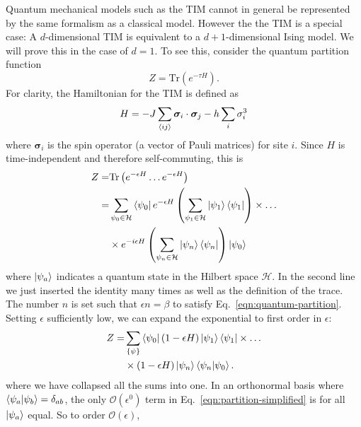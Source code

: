 \documentclass[amsmath,amssymb,aps,twocolumn,nofootinbib]{revtex4-2}
\newcommand{\parens}[1]{\left ( #1 \right )}
\begin{document}
Quantum mechanical models such as the TIM cannot in general be represented by the same formalism as a classical model. However the the TIM is a special case: A $d$-dimensional TIM is equivalent to a $d+1$-dimensional Ising model. We will prove this in the case of $d=1$. To see this, consider the quantum partition function
\begin{equation}
  Z = \mathrm{Tr}\parens{e^{-\tau H}}.
  \label{eqn:quantum-partition}
\end{equation}
For clarity, the Hamiltonian for the TIM is defined as  
\begin{equation}
  H = -J \sum_{\braket{ij}}\bm \sigma_i \cdot \bm \sigma_j - h \sum_i\sigma_i^3
\end{equation}
where $\bm \sigma_i$ is the spin operator (a vector of Pauli matrices) for site $i$. Since $H$ is time-independent and therefore self-commuting, this is 
\begin{equation}
  \begin{split}
    Z =& \mathrm{Tr}\parens{e^{-\epsilon H}\dots e^{-\epsilon H}}\\
     =& \sum_{\psi_0\in\mathcal{H}}\bra{\psi_0}e^{-\epsilon H}\parens{\sum_{\psi_1\in\mathcal{H}}\ket{\psi_1}\bra{\psi_1}}\times\dots\\
     &\times e^{-i\epsilon H}\parens{\sum_{\psi_n\in\mathcal{H}}\ket{\psi_n}\bra{\psi_n}}\ket{\psi_0}
  \end{split}
\end{equation}
where $\ket{\psi_a}$ indicates a quantum state in the Hilbert space $\mathcal{H}$. In the second line we just inserted the identity many times as well as the definition of the trace. The number $n$ is set such that $\epsilon n = \beta$ to satisfy Eq.~\ref{eqn:quantum-partition}. Setting $\epsilon$ sufficiently low, we can expand the exponential to first order in $\epsilon$:
\begin{equation}
  \begin{split}
    Z =& \sum_{\{\psi\}}\bra{\psi_0}(1 - \epsilon H)\ket{\psi_1}\bra{\psi_1}\times\dots\\
    &\times (1 - \epsilon H)\ket{\psi_n}\braket{\psi_n|\psi_0}.
  \end{split}
  \label{eqn:partition-simplified}
\end{equation}
where we have collapsed all the sums into one. In an orthonormal basis where $\braket{\psi_a|\psi_b} = \delta_{ab}$, the only $\mathcal{O}(\epsilon^0)$ term in Eq.~\ref{eqn:partition-simplified} is for all $\ket{\psi_a}$ equal. So to order $\mathcal{O}(\epsilon)$,
\end{document}
